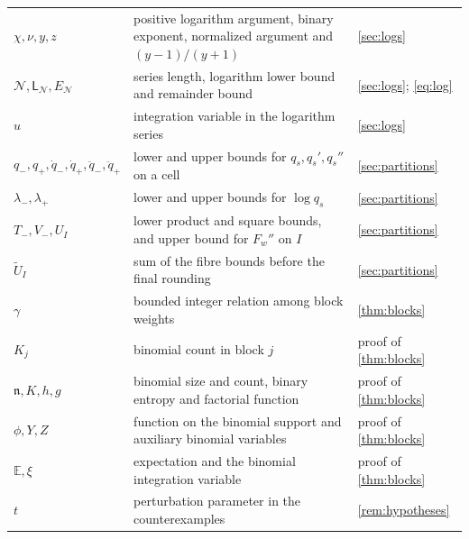 \documentclass[11pt,a4paper]{article}
\numberwithin{equation}{section}
\theoremstyle{remark}
\begin{document}
\begin{longtable}{p{}p{}p{}}
$\chi,\nu,y,z$ & positive logarithm argument, binary exponent, normalized argument and $(y-1)/(y+1)$ & \cref{sec:logs}\\
$\mathcal N,\mathsf L_{\mathcal N},E_{\mathcal N}$ & series length, logarithm lower bound and remainder bound & \cref{sec:logs}; \eqref{eq:log}\\
$u$ & integration variable in the logarithm series & \cref{sec:logs}\\
$q_-,q_+,\dot q_-,\dot q_+,\ddot q_-,\ddot q_+$ & lower and upper bounds for $q_s,q_s',q_s''$ on a cell & \cref{sec:partitions}\\
$\lambda_-,\lambda_+$ & lower and upper bounds for $\log q_s$ & \cref{sec:partitions}\\
$T_-,V_-,U_I$ & lower product and square bounds, and upper bound for $F_w''$ on $I$ & \cref{sec:partitions}\\
$\widetilde U_I$ & sum of the fibre bounds before the final rounding & \cref{sec:partitions}\\
$\gamma$ & bounded integer relation among block weights & \cref{thm:blocks}\\
$K_j$ & binomial count in block $j$ & proof of \cref{thm:blocks}\\
$\mathfrak n,K,h,g$ & binomial size and count, binary entropy and factorial function & proof of \cref{thm:blocks}\\
$\phi,Y,Z$ & function on the binomial support and auxiliary binomial variables & proof of \cref{thm:blocks}\\
$\mathbb E,\xi$ & expectation and the binomial integration variable & proof of \cref{thm:blocks}\\
$t$ & perturbation parameter in the counterexamples & \cref{rem:hypotheses}\\
\end{longtable}
\normalsize
\end{document}
